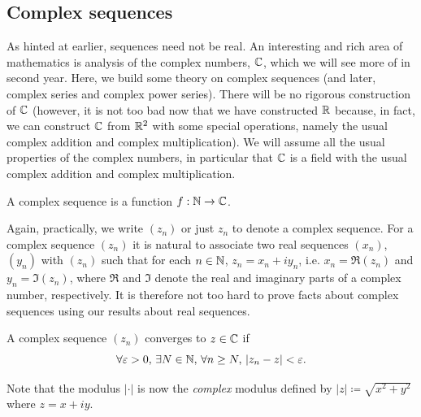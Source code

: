 \documentclass[../analysis1.tex]{subfiles}
\begin{document}
\subsection{Complex sequences}
As hinted at earlier, sequences need not be real. An interesting and rich area of mathematics is analysis of the complex numbers, $\mathbb{C}$, which we will see more of in second year. 
Here, we build some theory on complex sequences (and later, complex series and complex power series). There will be no rigorous construction of $\mathbb{C}$ (however, it is not too bad now that we have constructed $\mathbb{R}$ because, in fact, we can construct $\mathbb{C}$ from $\mathbb{R}^2$ with some special operations, namely the usual complex addition and complex multiplication). We will assume all the usual properties of the complex numbers, in particular that $\mathbb{C}$ is a field with the usual complex addition and complex multiplication.
\begin{definition}
    \begin{shaded*}
        A complex sequence is a function $f:\mathbb{N}\to\mathbb{C}$.
    \end{shaded*}
\end{definition}
Again, practically, we write $(z_n)$ or just $z_n$ to denote a complex sequence. For a complex sequence $(z_n)$ it is natural to associate two real sequences $(x_n)$, $(y_n)$ with $(z_n)$ such that for each $n\in \mathbb{N}$, $z_n=x_n+iy_n$, i.e. $x_n=\Re(z_n)$ and $y_n=\Im(z_n)$, where $\Re$ and $\Im$ denote the real and imaginary parts of a complex number, respectively.
It is therefore not too hard to prove facts about complex sequences using our results about real sequences.

\begin{definition}
    \begin{shaded*}
        A complex sequence $(z_n)$ converges to $z\in \mathbb{C}$ if $$\forall\varepsilon>0,\,\exists N\in\mathbb{N},\, \forall n\ge N,\, |z_n-z|<\varepsilon.$$
    \end{shaded*}
\end{definition}
\begin{remark}
    Note that the modulus $|\cdot|$ is now the \textit{complex} modulus defined by $|z|\coloneqq\sqrt{x^2+y^2}$ where $z=x+iy$.
\end{remark}
\end{document}

